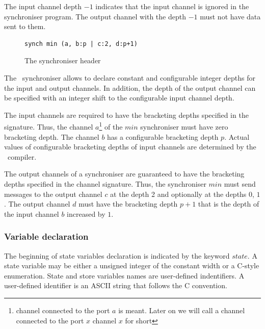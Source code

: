 The input channel depth $-1$ indicates that the input channel is ignored in the synchroniser program. The output channel with the depth $-1$ must not have data sent to them.

\begin{figure}[h!]
\begin{lstlisting}[frame=single]
synch min (a, b:p | c:2, d:p+1)
\end{lstlisting}
\caption{The synchroniser header}
\label{min_sync_head}
\end{figure}


The \ak\ synchroniser allows to declare constant and configurable integer depths for the input and output channels. In addition, the depth of the output channel can be specified with an integer shift to the configurable input channel depth.

The input channels are required to have the bracketing depths specified in the signature. Thus, the channel $a$\footnote{channel connected to the port $a$ is meant. Later on we will call a channel connected to the port $x$ channel $x$ for short} of the $min$ synchroniser must have zero bracketing depth. The channel $b$ has a configurable bracketing depth $p$. Actual values of configurable bracketing depths of input channels are determined by the \ak\ compiler. %

The output channels of a synchroniser are guaranteed to have the bracketing depths specified in the channel signature. Thus, the synchroniser $min$ must send messages to the output channel $c$ at the depth 2 and optionally at the depths $0$, $1$. The output channel $d$ must have the bracketing depth $p+1$ that is the depth of the input channel $b$ increased by $1$.


  \subsubsection{Variable declaration}
The beginning of state variables declaration is indicated by the keyword $state$. A state variable may be either a unsigned integer of the constant width or a C-style enumeration. State and store variables names are user-defined indentifiers. A user-defined identifier is an ASCII string that follows the C convention.

